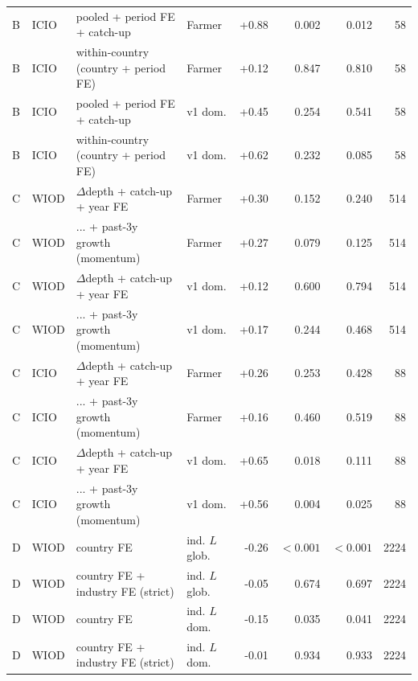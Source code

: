 \begin{longtable}{ll>{\raggedright\arraybackslash}p{4.6cm}lrrrr}
B & ICIO & pooled + period FE + catch-up & Farmer & +0.88 & 0.002 & 0.012 & 58 \\
B & ICIO & within-country (country + period FE) & Farmer & +0.12 & 0.847 & 0.810 & 58 \\
B & ICIO & pooled + period FE + catch-up & v1 dom. & +0.45 & 0.254 & 0.541 & 58 \\
B & ICIO & within-country (country + period FE) & v1 dom. & +0.62 & 0.232 & 0.085 & 58 \\
C & WIOD & $\Delta$depth + catch-up + year FE & Farmer & +0.30 & 0.152 & 0.240 & 514 \\
C & WIOD & ... + past-3y growth (momentum) & Farmer & +0.27 & 0.079 & 0.125 & 514 \\
C & WIOD & $\Delta$depth + catch-up + year FE & v1 dom. & +0.12 & 0.600 & 0.794 & 514 \\
C & WIOD & ... + past-3y growth (momentum) & v1 dom. & +0.17 & 0.244 & 0.468 & 514 \\
C & ICIO & $\Delta$depth + catch-up + year FE & Farmer & +0.26 & 0.253 & 0.428 & 88 \\
C & ICIO & ... + past-3y growth (momentum) & Farmer & +0.16 & 0.460 & 0.519 & 88 \\
C & ICIO & $\Delta$depth + catch-up + year FE & v1 dom. & +0.65 & 0.018 & 0.111 & 88 \\
C & ICIO & ... + past-3y growth (momentum) & v1 dom. & +0.56 & 0.004 & 0.025 & 88 \\
D & WIOD & country FE & ind. $L$ glob. & -0.26 & $<0.001$ & $<0.001$ & 2224 \\
D & WIOD & country FE + industry FE (strict) & ind. $L$ glob. & -0.05 & 0.674 & 0.697 & 2224 \\
D & WIOD & country FE & ind. $L$ dom. & -0.15 & 0.035 & 0.041 & 2224 \\
D & WIOD & country FE + industry FE (strict) & ind. $L$ dom. & -0.01 & 0.934 & 0.933 & 2224 \\
\bottomrule
\end{longtable}

